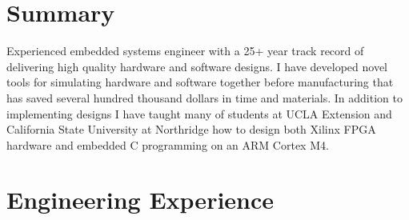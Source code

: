 \documentclass[11pt,letter]{moderncv}
\begin{document}
\maketitle
\section{Summary}
Experienced embedded systems engineer with a 25+ year track record of delivering high quality hardware and software designs.  I have developed novel tools for simulating hardware and software together before manufacturing that has saved several hundred thousand dollars in time and materials.  In addition to implementing designs I have taught many of students at UCLA Extension and California State University at Northridge how to design both Xilinx FPGA hardware and embedded C programming on an ARM Cortex M4.

\section{Engineering Experience}

\end{document}
